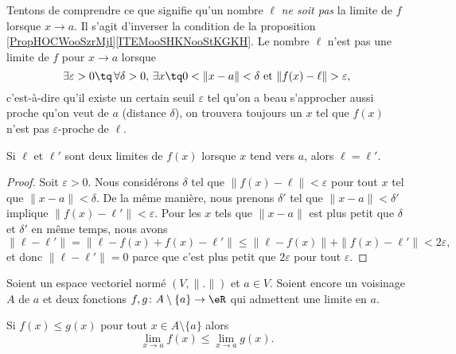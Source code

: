 Tentons de comprendre ce que signifie qu'un nombre \( \ell\) \emph{ne soit pas} la limite de \( f\) lorsque \( x\to a\). Il s'agit d'inverser la condition de la proposition \ref{PropHOCWooSzrMjl}\ref{ITEMooSHKNooStKGKH}. Le nombre \( \ell\) n'est pas une limite de \( f\) pour \( x\to a\) lorsque
\begin{equation}		\label{EqCaractNonLim}
	\exists\varepsilon>0\tq\,\forall\delta>0,\,\exists x\tq 0<\| x-a \|<\delta\text{ et }\| f(x)-\ell \|>\varepsilon,
\end{equation}
c'est-à-dire qu'il existe un certain seuil \( \varepsilon\) tel qu'on a beau s'approcher aussi proche qu'on veut de \( a\) (distance \( \delta\)), on trouvera toujours un \( x\) tel que \( f(x)\) n'est pas \( \varepsilon\)-proche de \( \ell\).

\begin{lemma}
	Si \( \ell\) et \( \ell'\) sont deux limites de \( f(x)\) lorsque \( x\) tend vers \( a\), alors \( \ell=\ell'\).
\end{lemma}

\begin{proof}
	Soit \( \varepsilon>0\). Nous considérons \( \delta\) tel que \( \| f(x)-\ell \|<\varepsilon\) pour tout \( x\) tel que \( \| x-a \|<\delta\). De la même manière, nous prenons \( \delta'\) tel que \( \| x-a \|<\delta'\) implique \( \| f(x)-\ell' \|<\varepsilon\). Pour les \( x\) tels que \( \| x-a \|\) est plus petit que \( \delta\) et \( \delta'\) en même temps, nous avons
	\begin{equation}
		\| \ell-\ell' \|=\| \ell-f(x)+f(x)-\ell' \|\leq\| \ell-f(x) \|+\| f(x)-\ell' \|<2\varepsilon,
	\end{equation}
	et donc \( \| \ell-\ell' \|=0\) parce que c'est plus petit que \( 2\varepsilon\) pour tout \( \varepsilon\).
\end{proof}

\begin{proposition}  \label{PROPooKPOXooEHIXJs}
	Soient un espace vectoriel normé \( (V,\| . \|)\) et \( a\in V\). Soient encore un voisinage \( A\) de \( a\) et deux fonctions \( f,g\colon A\setminus \{ a \}\to \eR\) qui admettent une limite en \( a\).

	Si \( f(x)\leq g(x)\) pour tout \( x\in A\setminus \{ a \}\) alors
	\begin{equation}
		\lim_{x\to a} f(x)\leq \lim_{x\to a} g(x).
	\end{equation}
\end{proposition}

